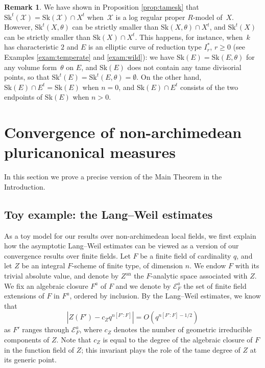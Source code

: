 \documentclass[11pt]{article}
\let\mathcal\mathscr
\theoremstyle{definition}
\newtheorem{remark}[equation]{Remark}
\numberwithin{equation}{subsection}
\newcommand{\cX}{\ensuremath{\mathscr{X}}}
\newcommand{\an}{\mathrm{an}}
\newcommand{\Sk}{\mathrm{Sk}}
\let\form\theta
\begin{document}
\begin{remark}
We have shown in Proposition \ref{prop:tamesk} that $\Sk^t(\cX)=\Sk(\cX)\cap X^t$ when~$\cX$ is a log regular proper $R$\nobreakdash-model of~$X$. However, $\Sk^t(X,\form)$ can be strictly smaller than $\Sk(X,\form)\cap X^t$, and $\Sk^t(X)$ can be strictly smaller than $\Sk(X)\cap X^t$.
This happens, for instance, when~$k$ has characteristic $2$ and $E$ is an elliptic curve of reduction type $I_r^{\ast}$, $r\geq 0$ (see Examples \ref{exam:temperate} and \ref{exam:wild}): we have $\Sk(E)=\Sk(E,\form)$ for any volume form~$\form$ on $E$, and $\Sk(E)$ does not contain any tame divisorial points, so that $\Sk^t(E)=\Sk^t(E,\form)=\emptyset$. On the other hand, $\Sk(E)\cap E^t=\Sk(E)$ when $n=0$, and $\Sk(E)\cap E^t$ consists of the two endpoints of $\Sk(E)$ when $n>0$.
\end{remark}

\pagebreak[2]
\section{Convergence of non-archimedean pluricanonical measures}\label{sec:padic}
In this section we prove a precise version of the Main Theorem in the Introduction.

\subsection{Toy example: the Lang--Weil estimates}\label{sec:langweil}
As a toy model for our results over non-archimedean local fields, we first explain how the asymptotic Lang--Weil estimates can be viewed as a version of our convergence results over finite fields. Let $F$ be a finite field of cardinality $q$, and let $Z$ be an integral $F$-scheme of finite type, of dimension $n$. We endow $F$ with its trivial absolute value, and denote by $Z^{\an}$ the $F$-analytic space associated with $Z$.
We fix an algebraic closure $F^a$ of $F$ and we denote by $\mathcal{E}^a_F$ the set of finite field extensions of $F$ in $F^a$, ordered by inclusion. By the Lang--Weil estimates, we know that
\[
|Z(F')-c_Zq^{n[F'\colon F]}|= O(q^{n[F'\colon F]-1/2})
\]
as $F'$ ranges through $\mathcal{E}^a_F$, where $c_Z$ denotes the number of geometric irreducible components of $Z$. Note that $c_Z$ is equal to the degree of the algebraic closure of $F$ in the function field of $Z$; this invariant plays the role of the tame degree of $Z$ at its generic point.
\end{document}
